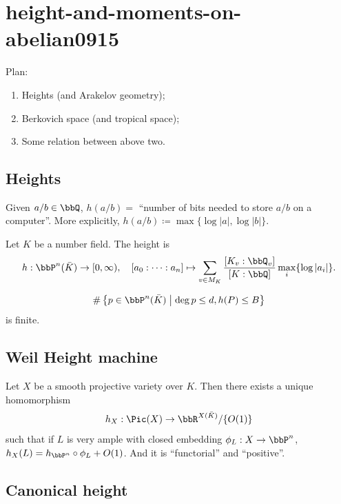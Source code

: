 \section{height-and-moments-on-abelian0915}

Plan:
\begin{enumerate}
	\item Heights (and Arakelov geometry);
	\item Berkovich space (and tropical space);
	\item Some relation between above two.
\end{enumerate}

\subsection[status=draft,tag=0000000,label=\labelNFM{subsec:height}]{Heights}

Given $a/b \in \bbQ$, $h(a/b) = $ ``number of bits needed to store $a/b$ on a computer''.
More explicitly, $h(a/b) \coloneqq \max \{ \log |a|, \log |b| \}$.

Let $K$ be a number field.
The height is
\[ h: \bbP^n(\bar{K}) \to [0,\infty), \quad [a_0:\cdots:a_n] \mapsto \sum_{v \in M_K} \frac{[K_v:\bbQ_v]}{[K:\bbQ]} \max_i \{ \log |a_i| \}. \]

\begin{theorem}[label=\labelNFM{thm:northcott}, status=draft, tag=0000000, title={Northcott property}]
	\[ \# \left\{ p \in \bbP^n(\bar{K}) \;\middle|\; \deg p \leq d, h(P) \leq B \right\} \]
	is finite.
\end{theorem}

\subsection[status=draft,tag=0000000,label=\labelNFM{subsec:heightmachine}]{Weil Height machine}

Let $X$ be a smooth projective variety over $K$.
Then there exists a unique homomorphism
\[ h_X: \Pic(X) \to \bbR^{X(\bar{K})}/\{O(1)\} \]
such that if $L$ is very ample with closed embedding $\phi_L: X \to \bbP^n$, $h_X(L) = h_{\bbP^n} \circ \phi_L + O(1)$.
And it is ``functorial'' and ``positive''.


\subsection[status=draft,tag=0000000,label=\labelNFM{subsec:nextsect}]{Canonical height}

